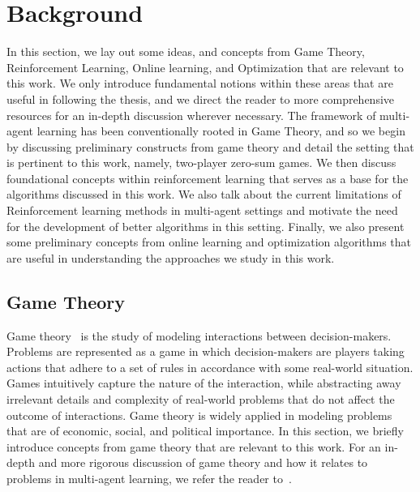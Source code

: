 \chapter{Background}
In this section, we lay out some ideas, and concepts from Game Theory, Reinforcement Learning, Online learning, and Optimization that are relevant to this work.
We only introduce fundamental notions within these areas that are useful in following the thesis, and we direct the reader to more comprehensive resources for an in-depth discussion wherever necessary.
The framework of multi-agent learning has been conventionally rooted in Game Theory, and so we begin by discussing preliminary constructs from game theory and detail the setting that is pertinent to this work, namely, two-player zero-sum games.
We then discuss foundational concepts within reinforcement learning that serves as a base for the algorithms discussed in this work. We also talk about the current limitations of Reinforcement learning methods in multi-agent settings and motivate the need for the development of better algorithms in this setting.
Finally, we also present some preliminary concepts from online learning and optimization algorithms that are useful in understanding the approaches we study in this work.

\section{Game Theory}
Game theory~\cite{osborneintroduction2004} is the study of modeling interactions between
decision-makers.
Problems are represented as a game in which decision-makers are players taking actions that adhere
to a set of rules in accordance with some real-world situation.
Games intuitively capture the nature of the interaction, while abstracting away irrelevant details
and complexity of real-world problems that do not affect the outcome of interactions.
Game theory is widely applied in modeling problems that are of economic, social, and political
importance.
In this section, we briefly introduce concepts from game theory that are relevant to this work.
For an in-depth and more rigorous discussion of game theory and how it relates to problems in multi-agent learning, we refer the reader
to~\cite{nisanAlgorithmic2007a, shohamMultiagent2008}.

